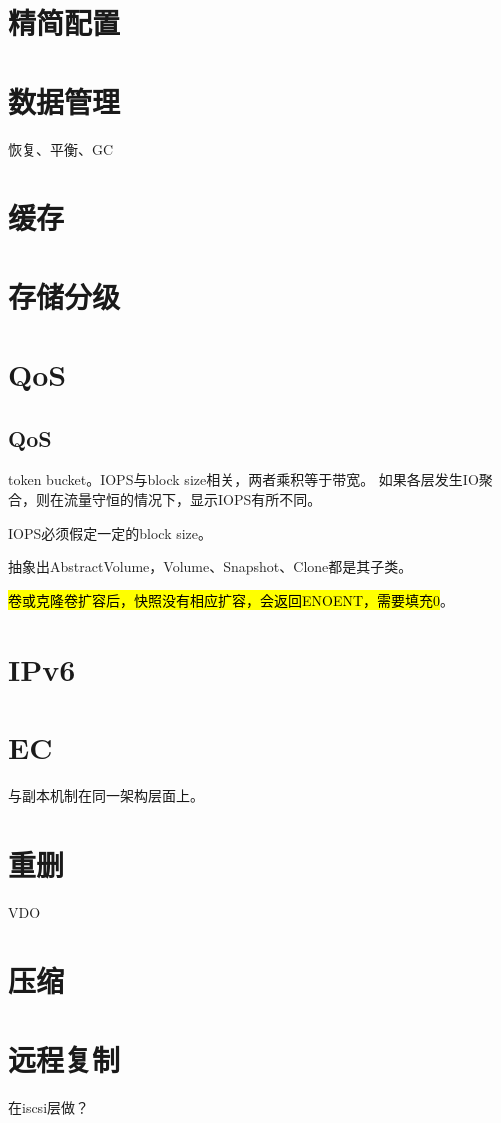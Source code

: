 \section{精简配置}

\section{数据管理}

恢复、平衡、GC

\section{缓存}

\section{存储分级}

\section{QoS}

\subsection{QoS}

token bucket。IOPS与block size相关，两者乘积等于带宽。
如果各层发生IO聚合，则在流量守恒的情况下，显示IOPS有所不同。

IOPS必须假定一定的block size。

抽象出AbstractVolume，Volume、Snapshot、Clone都是其子类。

\hl{卷或克隆卷扩容后，快照没有相应扩容，会返回ENOENT，需要填充0}。

\section{IPv6}

\section{EC}

与副本机制在同一架构层面上。

\section{重删}

VDO

\section{压缩}

\section{远程复制}

在iscsi层做？
